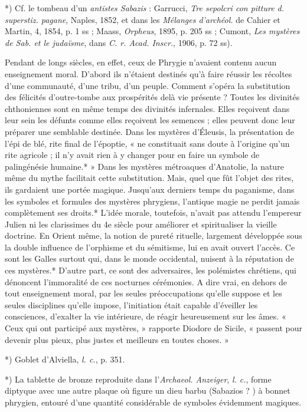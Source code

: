 \documentclass[a4paper, 11pt, oneside, polutonikogreek, french]{article}
\begin{document}
*) Cf. le tombeau d'un \emph{antistes Sabazis} : Garrucci, \emph{Tre sepolcri con pitture d. superstiz. pagane}, Naples, 1852, et dans les \emph{Mélanges d'archéol.} de Cahier et Martin, 4, 1854, p. 1 ss ; Maass, \emph{Orpheus}, 1895, p. 205 ss ; Cumont, \emph{Les mystères de Sab. et le judaïsme}, dans \emph{C. r. Acad. Inscr.}, 1906, p. 72 ss).

Pendant de longs siècles, en effet, ceux de Phrygie n'avaient contenu aucun enseignement moral. D'abord ils n'étaient destinés qu'à faire réussir les récoltes d'une communauté, d'une tribu, d'un peuple. Comment s'opéra la substitution des félicités d'outre-tombe aux prospérités delà vie présente ? Toutes les divinités chthoniennes sont en même temps des divinités infernales. Elles reçoivent dans leur sein les défunts comme elles reçoivent les semences ; elles peuvent donc leur préparer une semblable destinée. Dans les mystères d'Éleusis, la présentation de l'épi de blé, rite final de l'époptie, « ne constituait sans doute à l'origine qu'un rite agricole ; il n'y avait rien à y changer pour en faire un symbole de palingénésie humaine.* » Dans les mystères métroaques d'Anatolie, la nature même du mythe facilitait cette substitution. Mais, quel que fût l'objet des rites, ils gardaient une portée magique. Jusqu'aux derniers temps du paganisme, dans les symboles et formules des mystères phrygiens, l'antique magie ne perdit jamais complètement ses droits.* L'idée morale, toutefois, n'avait pas attendu l'empereur Julien ni les clarissimes du 4e siècle pour améliorer et spiritualiser la vieille doctrine. En Orient même, la notion de pureté rituelle, largement développée sous la double influence de l'orphisme et du sémitisme, lui en avait ouvert l'accès. Ce sont les Galles surtout qui, dans le monde occidental, nuisent à la réputation de ces mystères.* D'autre part, ce sont des adversaires, les polémistes chrétiens, qui dénoncent l'immoralité de ces nocturnes cérémonies. A dire vrai, en dehors de tout enseignement moral, par les seules préoccupations qu'elle suppose et les seules disciplines qu'elle impose, l'initiation était capable d'éveiller les consciences, d'exalter la vie intérieure, de réagir heureusement sur les âmes. « Ceux qui ont participé aux mystères, » rapporte Diodore de Sicile, « passent pour devenir plus pieux, plus justes et meilleurs en toutes choses. »

*) Goblet d'Alviella, \emph{l. c.}, p. 351.

*) La tablette de bronze reproduite dans l'\emph{Archaeol. Anzeiger}, \emph{l. c.}, forme diptyque avec une autre plaque où figure un dieu barbu (Sabazios ? ) à bonnet phrygien, entouré d'une quantité considérable de symboles évidemment magiques.
\end{document}
